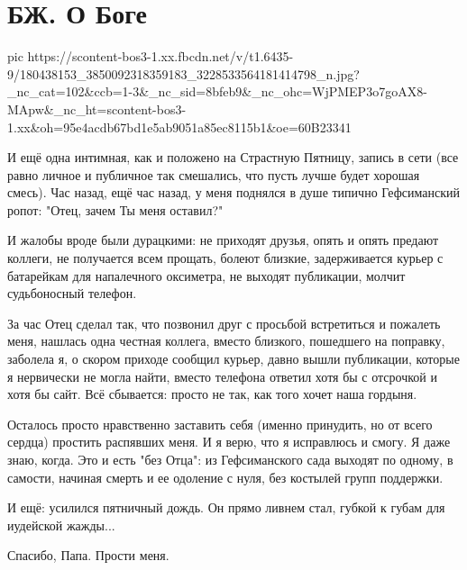  
 
 
 
 
\section{БЖ. О Боге}

\ifcmt
  pic https://scontent-bos3-1.xx.fbcdn.net/v/t1.6435-9/180438153_3850092318359183_3228533564181414798_n.jpg?_nc_cat=102&ccb=1-3&_nc_sid=8bfeb9&_nc_ohc=WjPMEP3o7goAX8-MApw&_nc_ht=scontent-bos3-1.xx&oh=95e4acdb67bd1e5ab9051a85ec8115b1&oe=60B23341
\fi


И ещё одна интимная, как и положено на Страстную Пятницу, запись в сети (все
равно личное и публичное так смешались, что пусть лучше будет хорошая смесь).
Час назад, ещё час назад, у меня поднялся в душе типично Гефсиманский ропот:
"Отец, зачем Ты меня оставил?" 

И жалобы вроде были дурацкими: не приходят друзья, опять и опять предают
коллеги, не получается всем прощать, болеют близкие, задерживается курьер с
батарейкам для напалечного оксиметра, не выходят публикации, молчит
судьбоносный телефон.

За час Отец сделал так, что позвонил друг с просьбой встретиться и пожалеть
меня, нашлась одна честная коллега, вместо близкого, пошедшего на поправку,
заболела я, о скором приходе сообщил курьер, давно вышли публикации, которые я
нервически не могла найти, вместо телефона ответил хотя бы с отсрочкой и хотя
бы сайт. Всё сбывается: просто не так, как того хочет наша гордыня.

Осталось просто нравственно заставить себя (именно принудить, но от всего
сердца) простить распявших меня. И я верю, что я исправлюсь и смогу. Я даже
знаю, когда. Это и есть "без Отца": из Гефсиманского сада выходят по одному, в
самости, начиная смерть и ее одоление с нуля, без костылей групп поддержки.

И ещё: усилился пятничный дождь. Он прямо ливнем стал, губкой к губам для
иудейской жажды...

Спасибо, Папа. Прости меня.
